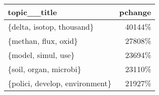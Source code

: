 \begin{tabular}{p{1.2cm}r}
\toprule
                   topic\_\_title &  pchange \\
\midrule
      \{delta, isotop, thousand\} &   40144\% \\
           \{methan, flux, oxid\} &   27808\% \\
            \{model, simul, use\} &   23694\% \\
         \{soil, organ, microbi\} &   23110\% \\
 \{polici, develop, environment\} &   21927\% \\
\bottomrule
\end{tabular}

